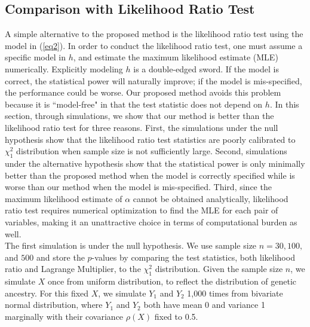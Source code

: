 \documentclass[12pt]{extarticle}
\theoremstyle{theorem}
\begin{document}
\subsection{Comparison with Likelihood Ratio Test}
A simple alternative to the proposed method is the likelihood ratio test using the model in (\ref{eq2}). In order to conduct the likelihood ratio test, one must assume a specific model in $h$, and estimate the maximum likelihood estimate (MLE) numerically. Explicitly modeling $h$ is a double-edged sword. If the model is correct, the statistical power will naturally improve; if the model is mis-specified, the performance could be worse. Our proposed method avoids this problem because it is ``model-free" in that the test statistic does not depend on $h$.  In this section, through simulations, we show that our method is better than the likelihood ratio test for three reasons. First, the simulations under the null hypothesis show that the likelihood ratio test statistics are poorly calibrated to $\chi_1^2$ distribution when sample size is not sufficiently large. Second, simulations under the alternative hypothesis show that the statistical power is only minimally better than the proposed method when the model is correctly specified while is worse than our method when the model is mis-specified. Third, since the maximum likelihood estimate of $\alpha$ cannot be obtained analytically, likelihood ratio test requires numerical optimization to find the MLE for each pair of variables, making it an unattractive choice in terms of computational burden as well.\\

\noindent The first simulation is under the null hypothesis. We use sample size $n = 30, 100,$ and $500$ and store the $p$-values by comparing the test statistics, both likelihood ratio and Lagrange Multiplier, to the $\chi_1^2$ distribution. Given the sample size $n$, we simulate $X$ once from uniform distribution, to reflect the distribution of genetic ancestry. For this fixed $X$, we simulate $Y_1$ and $Y_2$ 1,000 times from bivariate normal distribution, where $Y_1$ and $Y_2$ both have mean 0 and variance 1 marginally with their covariance $\rho(X)$ fixed to 0.5. \\
\end{document}
